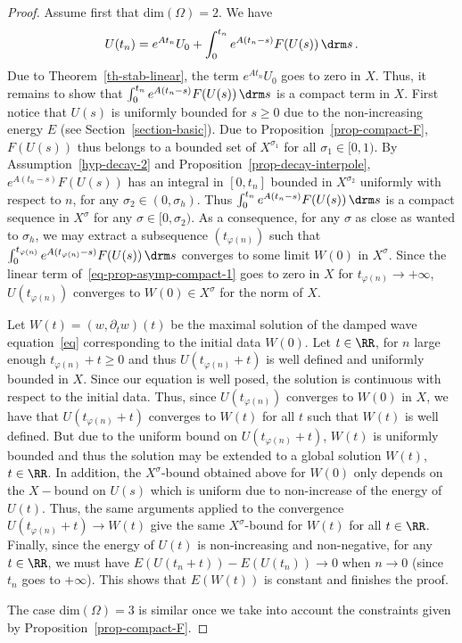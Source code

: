 \begin{proof}
Assume first that dim$(\Omega)=2$. We have
\begin{equation}\label{eq-prop-asymp-compact-1}
U(t_n)=e^{At_n}U_0 + \int_0^{t_n} e^{A(t_n-s)}F(U(s))\,\drm s\,.
\end{equation}
Due to Theorem~\ref{th-stab-linear}, the term $e^{At_n}U_0$ goes to zero in $X$. Thus, it remains to show that $\int_0^{t_n} e^{A(t_n-s)}F(U(s))\,\drm s$ is a compact term in $X$. First notice that $U(s)$ is uniformly bounded for $s\geq 0$ due to the non-increasing energy $E$ (see Section~\ref{section-basic}). Due to Proposition~\ref{prop-compact-F}, $F(U(s))$ thus belongs to a bounded set of $X^{\sigma_1}$ for all $\sigma_1\in [0,1)$. By Assumption~\eqref{hyp-decay-2} and Proposition~\ref{prop-decay-interpole}, $e^{A(t_n-s)}F(U(s))$ has an integral in $[0,t_n]$ bounded in $X^{\sigma_2}$ uniformly with respect to $n$, for any $\sigma_2 \in (0,\sigma_h)$. Thus $\int_0^{t_n} e^{A(t_n-s)}F(U(s))\,\drm s$ is a compact sequence in $X^\sigma$ for any $\sigma\in [0,\sigma_2)$. As a consequence, for any $\sigma$ as close as wanted to $\sigma_h$, we may extract a subsequence $(t_{\varphi(n)})$ such that $\int_0^{t_{\varphi(n)}} e^{A(t_{\varphi(n)}-s)}F(U(s))\,\drm s$ converges to some limit $W(0)$ in $X^\sigma$. Since the linear term of~\eqref{eq-prop-asymp-compact-1} goes to zero in $X$ for $t_{\varphi(n)}\rightarrow +\infty$, $U(t_{\varphi(n)})$ converges to $W(0)\in X^\sigma$ for the norm of $X$.

Let $W(t)=(w,\partial_t w)(t)$ be the maximal solution of the damped wave equation~\eqref{eq} corresponding to the initial data $W(0)$. Let $t\in\RR$, for $n$ large enough $t_{\varphi(n)}+t\geq 0$ and thus $U(t_{\varphi(n)}+t)$ is well defined and uniformly bounded in $X$. Since our equation is well posed, the solution is continuous with respect to the initial data. Thus, since $U(t_{\varphi(n)})$ converges to $W(0)$ in $X$, we have that $U(t_{\varphi(n)}+t)$ converges to $W(t)$ for all $t$ such that $W(t)$ is well defined. But due to the uniform bound on $U(t_{\varphi(n)}+t)$, $W(t)$ is uniformly bounded and thus the solution may be extended to a global solution $W(t)$, $t\in\RR$. In addition, the $X^\sigma$-bound obtained above for $W(0)$ only depends on the $X-$bound on $U(s)$ which is uniform due to non-increase of the energy of $U(t)$. Thus, the same arguments applied to the convergence $U(t_{\varphi(n)}+t)\rightarrow W(t)$ give the same $X^\sigma$-bound for $W(t)$ for all $t\in\RR$. Finally, since the energy of $U(t)$ is non-increasing and non-negative, for any $t\in\RR$, we must have $E(U(t_n+t))-E(U(t_n))\rightarrow 0$ when $n\rightarrow 0$ (since $t_n$ goes to $+\infty$). This shows that $E(W(t))$ is constant and finishes the proof.

The case dim$(\Omega)=3$ is similar once we take into account the constraints given by Proposition~\ref{prop-compact-F}.
\end{proof}


